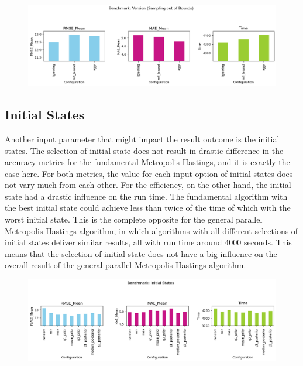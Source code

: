\begin{figure}[H]
    \centering
    \includegraphics[width=1\textwidth]{figures/gpmh/sotb.png}
    \captionsetup{width=.8\textwidth}
    \caption{}
    \label{fig:enter-label}
\end{figure}

\subsection{Initial States}
Another input parameter that might impact the result outcome is the initial states. The selection of initial state does not result in drastic difference in the accuracy metrics for the fundamental Metropolis Hastings, and it is exactly the case here. For both metrics, the value for each input option of initial states does not vary much from each other. For the efficiency, on the other hand, the initial state had a drastic influence on the run time. The fundamental algorithm with the best initial state could achieve less than twice of the time of which with the worst initial state. This is the complete opposite for the general parallel Metropolis Hastings algorithm, in which algorithms with all different selections of initial states deliver similar results, all with run time around 4000 seconds. This means that the selection of initial state does not have a big influence on the overall result of the general parallel Metropolis Hastings algorithm. 

\begin{figure}[H]
    \centering
    \includegraphics[width=1\textwidth]{figures/gpmh/init_states.png}
    \captionsetup{width=.8\textwidth}
    \caption{}
    \label{fig:enter-label}
\end{figure}

